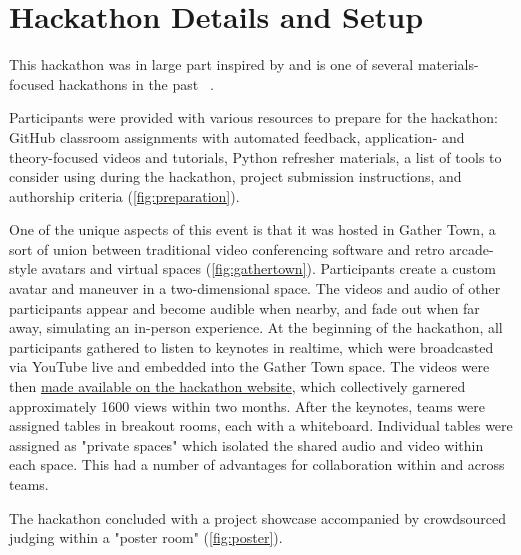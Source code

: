 \documentclass[superscriptaddress, nofootinbib,  amsmath, amssymb, twocolumn]{revtex4-2} %
\let\originalcite\cite
\renewcommand{\cite}[1]{\unskip~\originalcite{#1}}
\begin{document}


\section{Hackathon Details and Setup}

This hackathon was in large part inspired by \citet{jablonka_14_2023} and is one of several materials-focused hackathons in the past \cite{mulholland_hackathon_2015, sparks_insights_2024}. %

Participants were provided with various resources to prepare for the hackathon: GitHub classroom assignments with automated feedback, application- and theory-focused videos and tutorials, Python refresher materials, a list of tools to consider using during the hackathon, project submission instructions, and authorship criteria (\cref{fig:preparation}).

One of the unique aspects of this event is that it was hosted in Gather Town, a sort of union between traditional video conferencing software and retro arcade-style avatars and virtual spaces (\cref{fig:gathertown}). Participants create a custom avatar and maneuver in a two-dimensional space. The videos and audio of other participants appear and become audible when nearby, and fade out when far away, simulating an in-person experience. At the beginning of the hackathon, all participants gathered to listen to keynotes in realtime, which were broadcasted via YouTube live and embedded into the Gather Town space. The videos were then \href{https://ac-bo-hackathon.github.io/videos-slides/}{made available on the hackathon website}, which collectively garnered approximately 1600 views within two months. After the keynotes, teams were assigned tables in breakout rooms, each with a whiteboard. Individual tables were assigned as "private spaces" which isolated the shared audio and video within each space. This had a number of advantages for collaboration within and across teams.

The hackathon concluded with a project showcase accompanied by crowdsourced judging within a "poster room" (\cref{fig:poster}).
\end{document}
